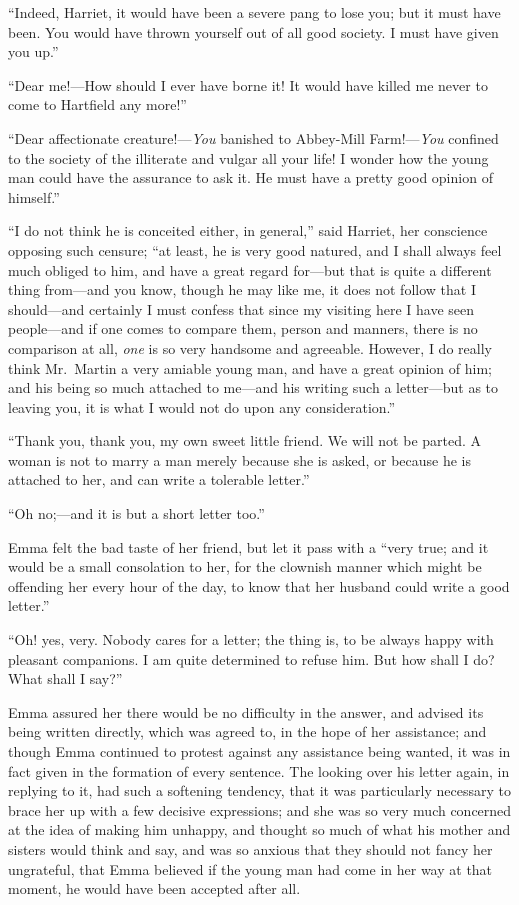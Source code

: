 ``Indeed, Harriet, it would have been a severe pang to lose you;
but it must have been.  You would have thrown yourself out of all
good society.  I must have given you up.''

``Dear me!---How should I ever have borne it! It would have killed
me never to come to Hartfield any more!''

``Dear affectionate creature!---\emph{You} banished to Abbey-Mill Farm!---\emph{You}
confined to the society of the illiterate and vulgar all your life!
I wonder how the young man could have the assurance to ask it.
He must have a pretty good opinion of himself.''

``I do not think he is conceited either, in general,'' said Harriet,
her conscience opposing such censure; ``at least, he is very good natured,
and I shall always feel much obliged to him, and have a great regard
for---but that is quite a different thing from---and you know,
though he may like me, it does not follow that I should---and
certainly I must confess that since my visiting here I have seen
people---and if one comes to compare them, person and manners,
there is no comparison at all, \emph{one} is so very handsome and agreeable.
However, I do really think Mr.\ Martin a very amiable young man,
and have a great opinion of him; and his being so much attached
to me---and his writing such a letter---but as to leaving you,
it is what I would not do upon any consideration.''

``Thank you, thank you, my own sweet little friend.  We will not
be parted.  A woman is not to marry a man merely because she is asked,
or because he is attached to her, and can write a tolerable letter.''

``Oh no;---and it is but a short letter too.''

Emma felt the bad taste of her friend, but let it pass with a
``very true; and it would be a small consolation to her, for the
clownish manner which might be offending her every hour of the day,
to know that her husband could write a good letter.''

``Oh! yes, very.  Nobody cares for a letter; the thing is, to be always
happy with pleasant companions.  I am quite determined to refuse him.
But how shall I do? What shall I say?''

Emma assured her there would be no difficulty in the answer,
and advised its being written directly, which was agreed to,
in the hope of her assistance; and though Emma continued to protest
against any assistance being wanted, it was in fact given in the
formation of every sentence.  The looking over his letter again,
in replying to it, had such a softening tendency, that it was
particularly necessary to brace her up with a few decisive expressions;
and she was so very much concerned at the idea of making him unhappy,
and thought so much of what his mother and sisters would think and say,
and was so anxious that they should not fancy her ungrateful,
that Emma believed if the young man had come in her way at that moment,
he would have been accepted after all.

